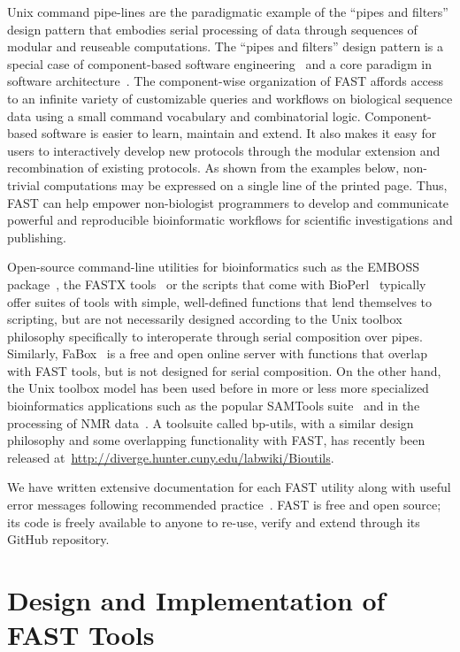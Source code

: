 \documentclass{frontiersSCNS} %
\begin{document}
Unix command pipe-lines are the paradigmatic example of the ``pipes
and filters'' design pattern that embodies serial processing of data
through sequences of modular and reuseable computations. The ``pipes
and filters'' design pattern is a special case of component-based
software engineering~\citep{mcilroy_mass-produced_1969} and a core
paradigm in software
architecture~\citep{garlan_introduction_1994}. The component-wise
organization of FAST affords access to an infinite variety of
customizable queries and workflows on biological sequence data using a
small command vocabulary and combinatorial logic. Component-based
software is easier to learn, maintain and extend. It also makes it
easy for users to interactively develop new protocols through the
modular extension and recombination of existing protocols. As shown
from the examples below, non-trivial computations may be expressed on
a single line of the printed page. Thus, FAST can help empower
non-biologist programmers to develop and communicate powerful and
reproducible bioinformatic workflows for scientific investigations and
publishing.

Open-source command-line utilities for bioinformatics such as the
EMBOSS package~\citep{Rice2000}, the FASTX tools~\citep{fastx} or the
scripts that come with BioPerl~\citep{Stajich2002} typically offer
suites of tools with simple, well-defined functions that lend
themselves to scripting, but are not necessarily designed according to
the Unix toolbox philosophy specifically to interoperate through
serial composition over pipes. Similarly, FaBox~\citep{MEN:MEN1821} is
a free and open online server with functions that overlap with FAST
tools, but is not designed for serial composition. On the other hand,
the Unix toolbox model has been used before in more or less more
specialized bioinformatics applications such as the popular SAMTools
suite~\citep{Li15082009} and in the processing of NMR
data~\citep{delaglio1995nmrpipe}. A toolsuite called bp-utils, with a
similar design philosophy and some overlapping functionality with
FAST, has recently been released
at~\url{http://diverge.hunter.cuny.edu/labwiki/Bioutils}.

We have written extensive documentation for each FAST utility along
with useful error messages following recommended
practice~\citep{Seemann2013}. FAST is free and open source; its code
is freely available to anyone to re-use, verify and extend through its
GitHub repository.

\section{Design and Implementation of FAST Tools}
\end{document}
